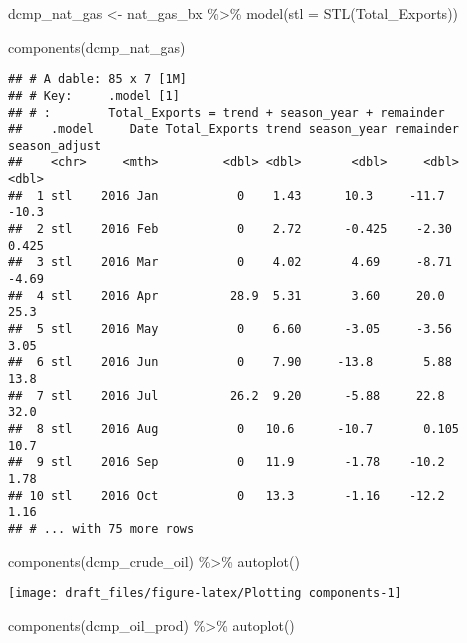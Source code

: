 \documentclass[
]{article}
\newenvironment{Shaded}{\begin{snugshade}}{\end{snugshade}}
\newcommand{\AttributeTok}[1]{\textcolor[rgb]{0.77,0.63,0.00}{#1}}
\newcommand{\FunctionTok}[1]{\textcolor[rgb]{0.00,0.00,0.00}{#1}}
\newcommand{\NormalTok}[1]{#1}
\newcommand{\OtherTok}[1]{\textcolor[rgb]{0.56,0.35,0.01}{#1}}
\newcommand{\SpecialCharTok}[1]{\textcolor[rgb]{0.00,0.00,0.00}{#1}}
\begin{document}
\begin{Shaded}
\begin{Highlighting}[]
\NormalTok{dcmp\_nat\_gas }\OtherTok{\textless{}{-}}\NormalTok{ nat\_gas\_bx }\SpecialCharTok{\%\textgreater{}\%}
  \FunctionTok{model}\NormalTok{(}\AttributeTok{stl =} \FunctionTok{STL}\NormalTok{(Total\_Exports))}

\FunctionTok{components}\NormalTok{(dcmp\_nat\_gas)}
\end{Highlighting}
\end{Shaded}

\begin{verbatim}
## # A dable: 85 x 7 [1M]
## # Key:     .model [1]
## # :        Total_Exports = trend + season_year + remainder
##    .model     Date Total_Exports trend season_year remainder season_adjust
##    <chr>     <mth>         <dbl> <dbl>       <dbl>     <dbl>         <dbl>
##  1 stl    2016 Jan           0    1.43      10.3     -11.7         -10.3  
##  2 stl    2016 Feb           0    2.72      -0.425    -2.30          0.425
##  3 stl    2016 Mar           0    4.02       4.69     -8.71         -4.69 
##  4 stl    2016 Apr          28.9  5.31       3.60     20.0          25.3  
##  5 stl    2016 May           0    6.60      -3.05     -3.56          3.05 
##  6 stl    2016 Jun           0    7.90     -13.8       5.88         13.8  
##  7 stl    2016 Jul          26.2  9.20      -5.88     22.8          32.0  
##  8 stl    2016 Aug           0   10.6      -10.7       0.105        10.7  
##  9 stl    2016 Sep           0   11.9       -1.78    -10.2           1.78 
## 10 stl    2016 Oct           0   13.3       -1.16    -12.2           1.16 
## # ... with 75 more rows
\end{verbatim}

\begin{Shaded}
\begin{Highlighting}[]
\FunctionTok{components}\NormalTok{(dcmp\_crude\_oil) }\SpecialCharTok{\%\textgreater{}\%} \FunctionTok{autoplot}\NormalTok{()}
\end{Highlighting}
\end{Shaded}

\begin{center}\texttt{[image: draft\_files/figure-latex/Plotting components-1]} \end{center}

\begin{Shaded}
\begin{Highlighting}[]
\FunctionTok{components}\NormalTok{(dcmp\_oil\_prod) }\SpecialCharTok{\%\textgreater{}\%} \FunctionTok{autoplot}\NormalTok{()}
\end{Highlighting}
\end{Shaded}
\end{document}
